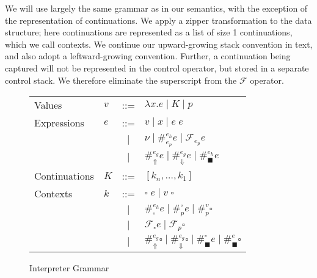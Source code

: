 \documentclass[11pt]{article}
\newcommand\F{\mathcal{F}}
\begin{document}
We will use largely the same grammar as in our semantics, with the exception of the representation of continuations.
We apply a zipper transformation to the data structure; here continuations are represented as a list of size 1 continuations, which we call contexts.
We continue our upward-growing stack convention in text, and also adopt a leftward-growing convention.
Further, a continuation being captured will not be represented in the control operator, but stored in a separate control stack.
We therefore eliminate the superscript from the $\F$ operator.

\begin{figure}[H]
\caption{Interpreter Grammar}
\label{fig:startGrammar}

\renewcommand{\arraystretch}{1.5}
\begin{tabular}{llcl}
Values & $v$ & ::= & $\lambda x.e \mid K \mid p$ \\
Expressions & $e$ & ::= & $v \mid x \mid e\;e$ \\
& & $|$ & $\nu \mid \#_{e_p}^{e_h}e \mid \F_{e_p}e$ \\
& & $|$ & $\#_\Uparrow^{e_g}e
    \mid   \#_\Downarrow^{e_g}e
    \mid   \#_\blacksquare^{e_h}e$ \\
Continuations & $K$ & ::= & $[k_n, \ldots, k_1]$ \\
Contexts & $k$ &
     ::= & $\square\;e
     \mid  v\;\square$ \\
& & $|$ & $\#_\square^{e_h} e
    \mid   \#_p^\square e
    \mid   \#_p^v \square$ \\
& & $|$ & $\F_\square e
    \mid   \F_p \square$ \\
& & $|$ & $\#_\Uparrow^{e_g}\square
    \mid   \#_\Downarrow^{e_g}\square
    \mid   \#_\blacksquare^\square e
    \mid   \#_\blacksquare^e\square$ \\
\end{tabular}
\end{figure}



\end{document}
